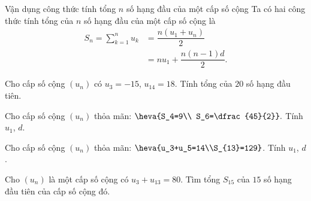 \begin{dang}{Vận dụng công thức tính tổng $n$ số hạng đầu của một cấp số cộng}
	Ta có hai công thức tính tổng của $n$ số hạng đầu của một cấp số cộng là \[\begin{aligned}
	S_n=\sum\limits_{k=1}^nu_{k}&=\dfrac{n(u_1+u_n)}{2}\\
	&=nu_1+\dfrac{n(n-1)d}{2}.
	\end{aligned}\]
\end{dang}
\begin{vd}%
	Cho cấp số cộng $(u_n)$ có $u_3=-15$, $u_{14}=18$. Tính tổng của $20$ số hạng đầu tiên.
\end{vd}
\begin{vd}%
	Cho cấp số cộng $(u_n)$ thỏa mãn: $\heva{S_4=9\\ S_6=\dfrac{45}{2}}.$ Tính $u_1$, $d$.
\end{vd}
\begin{vd}%
	Cho cấp số cộng $(u_n)$ thỏa mãn: $\heva{u_3+u_5=14\\S_{13}=129}$. Tính $u_1$, $d$.
\end{vd}
\begin{vd}
	Cho $(u_n)$ là một cấp số cộng có $u_3+u_{13}=80$. Tìm tổng $S_{15}$ của $15$ số hạng đầu tiên của cấp số cộng đó.
\end{vd}
